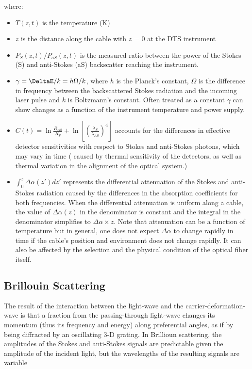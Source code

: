 \documentclass[twocolumn]{article}
\numberwithin{equation}{section}
\begin{document}
\begin{enumerate}
where:
\begin{itemize}
 \item $T(z,t)$ is the temperature (K) 
 \item $z$ is the distance along the cable with $z$ = 0 at the DTS instrument  
 \item $P_{S}(z,t)/P_{aS}(z,t)$ is the measured ratio between the power of the  Stokes (S) and anti-Stokes (aS) backscatter reaching the instrument.
 \item $\gamma = \DeltaE/ k = h \Omega / k$, where $h$ is the Planck’s constant, $\Omega$  is the difference in frequency between the backscattered Stokes radiation and the incoming laser pulse and $k$ is Boltzmann’s constant. Often  treated as a constant $\gamma$ can show changes as a function of the instrument temperature and power supply. 
 \item $C(t)=\ln\frac{R_{AS}}{R_{S}} + \ln\left[\left(\frac{\lambda_S}{\lambda_{AS}}\right)^4\right]$ accounts for the differences in effective detector sensitivities with respect to Stokes and anti-Stokes photons, which may  vary in time ( caused by thermal sensitivity of the detectors, as well as thermal variation in the alignment of the optical system.)
  \item $\int_0^z \Delta \alpha(z') dz'$ represents the differential attenuation of the Stokes and anti-Stokes radiation caused by the differences in the absorption coefficients for both  frequencies. When the differential attenuation is uniform along a cable,  the value of $\Delta \alpha(z)$ in the denominator is constant and the  integral in the denominator simplifies to $\Delta \alpha \times z$. Note  that attenuation can be a function of temperature but in general, one  does not expect $\Delta \alpha$ to change rapidly in time if the cable’s  position and environment does not change rapidly. It can also be affected by the selection and the physical condition of the optical fiber itself. 
\end{itemize}
\end{enumerate}




	\subsection{Brillouin Scattering}
The result of the interaction between the light-wave and the carrier-deformation-wave is that a fraction from the passing-through light-wave changes its momentum (thus its frequency and energy) along preferential angles, as if by being diffracted by an oscillating 3-D grating.
In Brillioun scattering, the amplitudes of the Stokes and anti-Stokes signals are predictable given the amplitude of the incident light, but the wavelengths of the resulting signals are variable 
\end{document}
